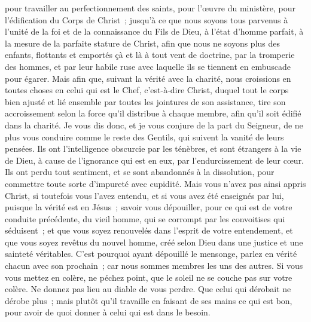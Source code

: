 \begin{multicols}{2}
pour travailler au perfectionnement des saints, pour l'œuvre du ministère, pour l'édification du Corps de Christ~;
jusqu'à ce que nous soyons tous parvenus à l'unité de la foi et de la connaissance du Fils de Dieu, à l'état d'homme parfait, à la mesure de la parfaite stature de Christ,
afin que nous ne soyons plus des enfants, flottants et emportés çà et là à tout vent de doctrine, par la tromperie des hommes, et par leur habile ruse avec laquelle ils se tiennent en embuscade pour égarer.
Mais afin que, suivant la vérité avec la charité, nous croissions en toutes choses en celui qui est le Chef, c'est-à-dire Christ,
duquel tout le corps bien ajusté et lié ensemble par toutes les jointures de son assistance, tire son accroissement selon la force qu'il distribue à chaque membre, afin qu'il soit édifié dans la charité.
Je vous dis donc, et je vous conjure de la part du Seigneur, de ne plus vous conduire comme le reste des Gentils, qui suivent la vanité de leurs pensées.
Ils ont l'intelligence obscurcie par les ténèbres, et sont étrangers à la vie de Dieu, à cause de l'ignorance qui est en eux, par l'endurcissement de leur cœur.
Ils ont perdu tout sentiment, et se sont abandonnés à la dissolution, pour commettre toute sorte d'impureté avec cupidité.
Mais vous n'avez pas ainsi appris Christ,
si toutefois vous l'avez entendu, et si vous avez été enseignés par lui, puisque la vérité est en Jésus~; 
savoir vous dépouiller, pour ce qui est de votre conduite précédente, du vieil homme, qui se corrompt par les convoitises qui séduisent~; 
et que vous soyez renouvelés dans l'esprit de votre entendement,
et que vous soyez revêtus du nouvel homme, créé selon Dieu dans une justice et une sainteté véritables.
C'est pourquoi ayant dépouillé le mensonge, parlez en vérité chacun avec son prochain~; car nous sommes membres les uns des autres.
Si vous vous mettez en colère, ne péchez point, que le soleil ne se couche pas sur votre colère.
Ne donnez pas lieu au diable de vous perdre.
Que celui qui dérobait ne dérobe plus~; mais plutôt qu'il travaille en faisant de ses mains ce qui est bon, pour avoir de quoi donner à celui qui est dans le besoin.

\end{multicols}
